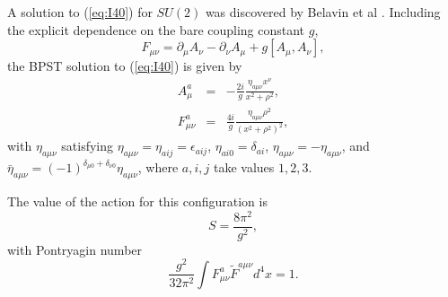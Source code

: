 A solution to (\ref{eq:I40}) for $SU(2)$ was discovered by Belavin
et al \cite{BPST}. Including the explicit dependence on the bare coupling
constant $g$,
\begin{equation}
F_{\mu \nu} = \partial_{\mu} A_{\nu} - \partial_{\nu} A_{\mu} +
g[A_{\mu}, A_{\nu}],
\label{eq:I41}
\end{equation}
the BPST solution to (\ref{eq:I40}) is given by
\begin{eqnarray}
A_{\mu}^{a} & = &  - \frac {2i}{g} \frac {\eta_{a \mu \nu}
x^{\nu}}{x^2+ \rho^2}, \nonumber \\
F_{\mu \nu}^{a} & = & \frac {4i}{g} \frac {\eta_{a \mu \nu}
\rho^2}{(x^2+\rho^2)^2},
\label{eq:I43}
\end{eqnarray}
with $\eta_{a \mu \nu}$ satisfying $\eta_{a \mu \nu}=\eta_{a
ij}=\epsilon_{aij}$, $\eta_{ai0}=\delta_{ai}$, $\eta_{a\mu \nu}=-
\eta_{a \mu \nu}$, and $\bar{\eta}_{a \mu \nu} =
(-1)^{\delta_{\mu 0}+\delta_{\nu 0}} \eta_{a \mu \nu}$, where
$a,i,j$ take values $1,2,3$.
  
The value of the action for this configuration is 
\begin{equation}
S= \frac {8 \pi^2}{g^2},
\label{eq:I44}
\end{equation}
with Pontryagin number
\begin{equation}
\frac {g^2}{32 \pi^2} \int F_{\mu \nu}^{a} \tilde{F}^{a \mu \nu}
d^4 x =1.
\label{eq:I45}
\end{equation}
  
